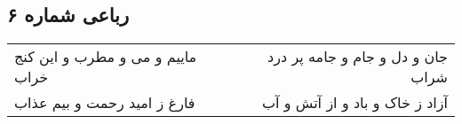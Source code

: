 \begin{center}
\section*{رباعی شماره ۶}
\label{sec:sh006}
\begin{longtable}{l p{0.5cm} r}
ماییم و می و مطرب و این کنج خراب
&&
جان و دل و جام و جامه پر درد شراب
\\
فارغ ز امید رحمت و بیم عذاب
&&
آزاد ز خاک و باد و از آتش و آب
\\
\end{longtable}
\end{center}
